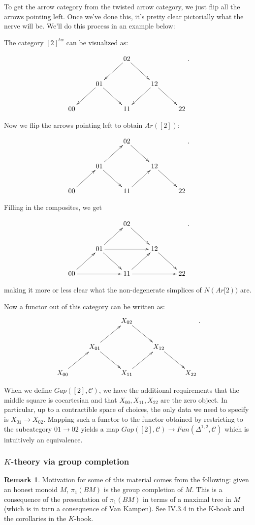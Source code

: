 \documentclass[letterpaper]{article}
\theoremstyle{definition}
\newtheorem{remark}[lemma]{Remark}
\newcommand{\mc}{\mathcal}
\begin{document}
To get the arrow category from the twisted arrow category, we just
flip all the arrows pointing left. Once we've done this, it's pretty
clear pictorially what the nerve will be. We'll do this process in an
example below:

The category $[2]^{tw}$ can be visualized as:

\[
\xymatrix{ & & 02 \ar[dr] \ar[dl] & & \\ & 01 \ar[dl] \ar[dr]& &12
  \ar[dr]\ar[dl] & \\ 00& & 11& & 22}.
\]

Now we flip the arrows pointing left to obtain $Ar([2])$:


\[
\xymatrix{ & & 02 \ar[dr]  & & \\ & 01 \ar[ur] \ar[dr]& &12
  \ar[dr] & \\ 00 \ar[ur] & & 11 \ar[ur]& & 22}.
\]

Filling in the composites, we get

\[
\xymatrix{ & & 02 \ar[dr]  & & \\ & 01 \ar[rr]\ar[ur] \ar[dr]& &12
  \ar[dr] & \\ 00 \ar[rr] \ar[ur] & & 11 \ar[rr] \ar[ur]& & 22}.
\]

making it more or less clear what the non-degenerate simplices of
$N(Ar[2))$ are. 

Now a functor out of this category can be written as: 
\[
\xymatrix{ & & X_{02} \ar[dr]  & & \\ & X_{01} \ar[ur] \ar[dr]& & X_{12}
  \ar[dr] & \\ X_{00} \ar[ur] & & X_{11} \ar[ur]& & X_{22}}.
\]

When we define $Gap([2],\mc C)$, we have the additional requirements
that the middle square is cocartesian and that $X_{00},X_{11},X_{22}$
are the zero object. In particular, up to a contractible space of
choices, the only data we need to specify
is $X_{01} \rightarrow X_{02}$. Mapping such a functor to the functor
obtained by restricting to the subcategory $01 \rightarrow 02$ yields
a map $Gap([2],\mc C) \rightarrow Fun(\Delta^{1,2},\mc C)$ which is
intuitively an equivalence. 

\subsubsection{$K$-theory via group completion}

\begin{remark}
Motivation for some of this material comes from the following: given
an honest monoid $M$, $\pi_1(BM)$ is the group completion of $M$. This
is a consequence of the presentation of $\pi_1(BM)$ in terms of a
maximal tree in $M$ (which is in turn a consequence of Van
Kampen). See IV.3.4 in the K-book and the corollaries in the
$K$-book. 
\end{remark}
\end{document}
